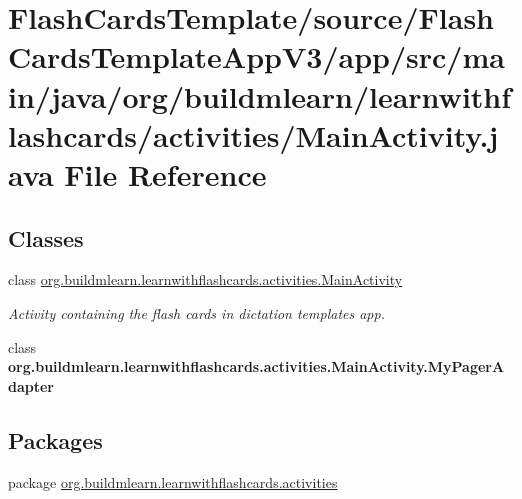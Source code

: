 \hypertarget{FlashCardsTemplate_2source_2FlashCardsTemplateAppV3_2app_2src_2main_2java_2org_2buildmlearn_2lea662cfb7ae014a144960116dfe6806ec9}{}\section{Flash\+Cards\+Template/source/\+Flash\+Cards\+Template\+App\+V3/app/src/main/java/org/buildmlearn/learnwithflashcards/activities/\+Main\+Activity.java File Reference}
\label{FlashCardsTemplate_2source_2FlashCardsTemplateAppV3_2app_2src_2main_2java_2org_2buildmlearn_2lea662cfb7ae014a144960116dfe6806ec9}
\subsection*{Classes}
\begin{DoxyCompactItemize}
\item 
class \hyperlink{classorg_1_1buildmlearn_1_1learnwithflashcards_1_1activities_1_1MainActivity}{org.\+buildmlearn.\+learnwithflashcards.\+activities.\+Main\+Activity}
\begin{DoxyCompactList}\small\item\em Activity containing the flash cards in dictation template\textquotesingle{}s app. \end{DoxyCompactList}\item 
class {\bfseries org.\+buildmlearn.\+learnwithflashcards.\+activities.\+Main\+Activity.\+My\+Pager\+Adapter}
\end{DoxyCompactItemize}
\subsection*{Packages}
\begin{DoxyCompactItemize}
\item 
package \hyperlink{namespaceorg_1_1buildmlearn_1_1learnwithflashcards_1_1activities}{org.\+buildmlearn.\+learnwithflashcards.\+activities}
\end{DoxyCompactItemize}
